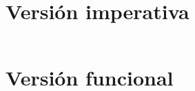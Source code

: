 \lipsum[1-1]

\section{Versión imperativa}
\inputminted{cpp}{codigo/cpp/kmp.cpp}


\section{Versión funcional}
\inputminted{haskell}{codigo/haskell/3-trees.hs}
